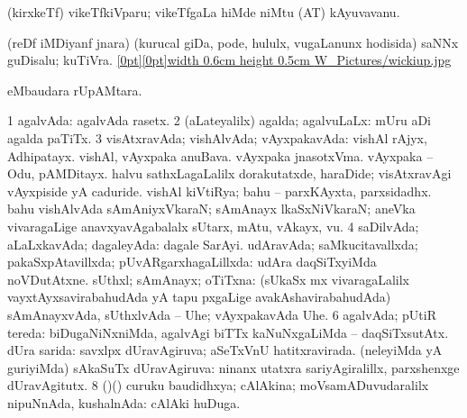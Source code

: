 {{{{{{\bentry 
{}
  \gl{\nA}\bmng
{} 
\emng
\eentry

\bentry
{}
  \gl{\nA}\bmng
{} 
\emng
\eentry

\bentry
{}
  \gl{\nA}\bmng
(kirxkeTf) vikeTfkiVparu; vikeTfgaLa hiMde niMtu (AT) kAyuvavanu. 
\emng
\eentry

\bentry
{}
\gl{\nA}
\bmng
(reDf iMDiyanf jnara) (kurucal giDa, pode, hululx, \mo vugaLanunx hodisida) saNNx guDisalu; kuTiVra. \quad \hyperlink{wickiupfigure}{\raisebox{-0.20cm}[0pt][0pt]{\pdfimage width 0.6cm height 0.5cm {W_Pictures/wickiup.jpg}}} 
\emng
\eentry

 \bentry
{}
  \gl{\kirxvi}\bmng
{} eMbaudara rUpAMtara. 
\emng
\eentry

\bentry
{} 
\gl{\gu}
\expl{}
\bmng
\bnum
\num{1} agalvAda:  agalvAda rasetx. 
\num{2} (aLateyalilx) agalda; agalvuLaLx:  mUru aDi agalda paTiTx. 
\num{3} visAtxravAda; vishAlvAda; vAyxpakavAda:  vishAl rAjyx, Adhipatayx.  vishAl, vAyxpaka anuBava.  vAyxpaka jnasotxVma.  vAyxpaka -- Odu, pAMDitayx.  halvu sathxLagaLalilx dorakutatxde, haraDide; visAtxravAgi vAyxpiside yA caduride.  vishAl kiVtiRya; bahu -- parxKAyxta, parxsidadhx.  bahu vishAlvAda sAmAniyxVkaraN; sAmAnayx lkaSxNiVkaraN; aneVka vivaragaLige anavxyavAgabalalx sUtarx, mAtu, vAkayx, \mo vu. 
\num{4} saDilvAda; aLaLxkavAda; dagaleyAda:  dagale SarAyi. 
\banum
{} udAravAda; saMkucitavallxda; pakaSxpAtavillxda; pUvARgarxhagaLillxda:  udAra daqSiTxyiMda noVDutAtxne. 
 sUthxl; sAmAnayx; oTiTxna:  (sUkaSx mx vivaragaLalilx vayxtAyxsavirabahudAda yA tapu pxgaLige avakAshavirabahudAda) sAmAnayxvAda, sUthxlvAda -- Uhe; vAyxpakavAda Uhe. 
\eanum
\numie
\num{6} agalvAda; pUtiR tereda:  biDugaNiNxniMda, agalvAgi biTTx kaNuNxgaLiMda -- daqSiTxsutAtx. 
 dUra sarida: 
\banum
{} savxlpx dUravAgiruva; aSeTxVnU hatitxravirada. 
 (neleyiMda yA guriyiMda) sAkaSuTx dUravAgiruva:  ninanx utatxra sariyAgiralillx, parxshenxge dUravAgitutx. 
\eanum
\numie
\num{8} (\birx)(\ashi) curuku baudidhxya; cAlAkina; moVsamADuvudaralilx nipuNnAda, kushalnAda:  cAlAki huDuga. 
\enum
\emng

}}}}}}
